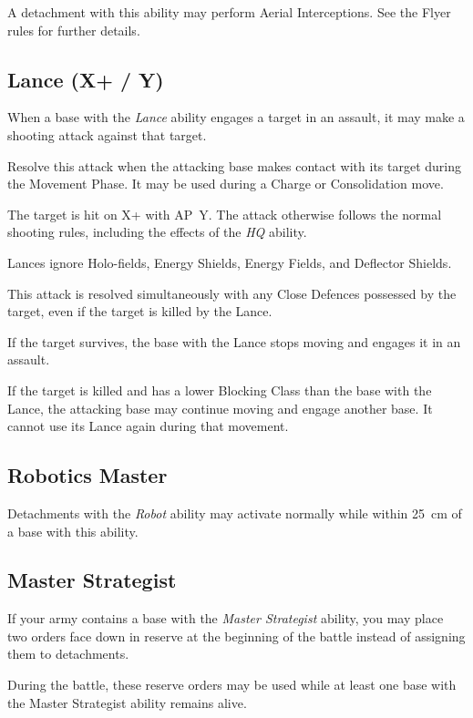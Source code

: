 A detachment with this ability may perform Aerial Interceptions. See the Flyer rules for further details.

\subsection{Lance (X+ / Y)}

When a base with the \textit{Lance} ability engages a target in an assault, it may make a shooting attack against that target.

Resolve this attack when the attacking base makes contact with its target during the Movement Phase. It may be used during a Charge or Consolidation move.

The target is hit on X+ with AP~Y. The attack otherwise follows the normal shooting rules, including the effects of the \textit{HQ} ability.

Lances ignore Holo-fields, Energy Shields, Energy Fields, and Deflector Shields.

This attack is resolved simultaneously with any Close Defences possessed by the target, even if the target is killed by the Lance.

If the target survives, the base with the Lance stops moving and engages it in an assault.

If the target is killed and has a lower Blocking Class than the base with the Lance, the attacking base may continue moving and engage another base. It cannot use its Lance again during that movement.

\subsection{Robotics Master}

Detachments with the \textit{Robot} ability may activate normally while within 25~cm of a base with this ability.

\subsection{Master Strategist}

If your army contains a base with the \textit{Master Strategist} ability, you may place two orders face down in reserve at the beginning of the battle instead of assigning them to detachments.

During the battle, these reserve orders may be used while at least one base with the Master Strategist ability remains alive.

